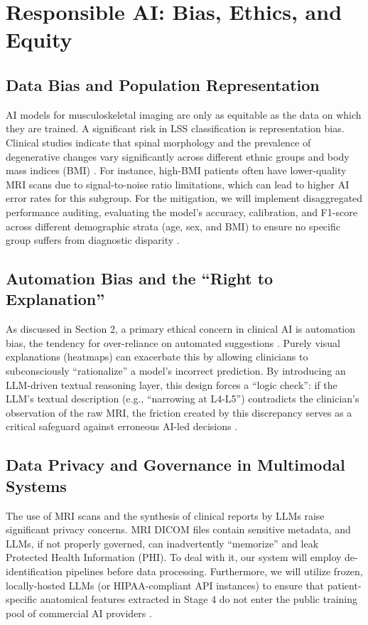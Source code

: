 \documentclass[12pt]{article}
\begin{document}
\section{Responsible AI: Bias, Ethics, and Equity}
\subsection{Data Bias and Population Representation}
AI models for musculoskeletal imaging are only as equitable as the data on which they are trained. A significant risk in LSS classification is representation bias. Clinical studies indicate that spinal morphology and the prevalence of degenerative changes vary significantly across different ethnic groups and body mass indices (BMI) \citep{Williams2015, Wng2023, Kalichman2009}. For instance, high-BMI patients often have lower-quality MRI scans due to signal-to-noise ratio limitations, which can lead to higher AI error rates for this subgroup. 
For the mitigation, we will implement disaggregated performance auditing, evaluating the model’s accuracy, calibration, and F1-score across different demographic strata (age, sex, and BMI) to ensure no specific group suffers from diagnostic disparity \citep{vandeSande2022, Lu2022} .

\subsection{Automation Bias and the “Right to Explanation”}
As discussed in Section 2, a primary ethical concern in clinical AI is automation bias, the tendency for over-reliance on automated suggestions \citep{Bergomi2025} . Purely visual explanations (heatmaps) can exacerbate this by allowing clinicians to subconsciously “rationalize” a model’s incorrect prediction. 
By introducing an LLM-driven textual reasoning layer, this design forces a “logic check”: if the LLM’s textual description (e.g., “narrowing at L4-L5”) contradicts the clinician’s observation of the raw MRI, the friction created by this discrepancy serves as a critical safeguard against erroneous AI-led decisions \citep{gale2018producingradiologistqualityreportsinterpretable, kayser2024fooloncecontrastingtextual}.

\subsection{Data Privacy and Governance in Multimodal Systems}
The use of MRI scans and the synthesis of clinical reports by LLMs raise significant privacy concerns. MRI DICOM files contain sensitive metadata, and LLMs, if not properly governed, can inadvertently “memorize” and leak Protected Health Information (PHI). 
To deal with it, our system will employ de-identification pipelines before data processing. Furthermore, we will utilize frozen, locally-hosted LLMs (or HIPAA-compliant API instances) to ensure that patient-specific anatomical features extracted in Stage 4 do not enter the public training pool of commercial AI providers \citep{Zhong2025}.
\end{document}
